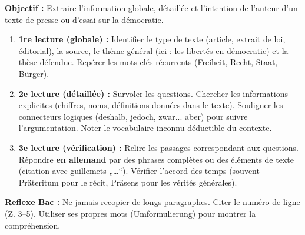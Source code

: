 \documentclass[11pt]{article}
\newcommand{\cle}[1]{{\popxbold\color{popdark}#1}}
\begin{document}
\begin{methode}
\textbf{Objectif :} Extraire l'information globale, détaillée et l'intention de l'auteur d'un texte de presse ou d'essai sur la démocratie.
\begin{enumerate}
    \item \textbf{1re lecture (globale) :} Identifier le \cle{type de texte} (article, extrait de loi, éditorial), la \cle{source}, le \cle{thème général} (ici : les libertés en démocratie) et la \cle{thèse} défendue. Repérer les \cle{mots-clés} récurrents (Freiheit, Recht, Staat, Bürger).
    \item \textbf{2e lecture (détaillée) :} Survoler les questions. Chercher les \cle{informations explicites} (chiffres, noms, définitions données dans le texte). Souligner les \cle{connecteurs logiques} (deshalb, jedoch, zwar... aber) pour suivre l'argumentation. Noter le \cle{vocabulaire inconnu} déductible du contexte.
    \item \textbf{3e lecture (vérification) :} Relire les passages correspondant aux questions. Répondre \textbf{en allemand} par des phrases complètes ou des éléments de texte (citation avec guillemets „…“). Vérifier l'accord des temps (souvent \cle{Präteritum} pour le récit, \cle{Präsens} pour les vérités générales).
\end{enumerate}
\textbf{Reflexe Bac :} Ne jamais recopier de longs paragraphes. Citer le numéro de ligne (Z. 3--5). Utiliser ses propres mots (Umformulierung) pour montrer la compréhension.
\end{methode}
\end{document}
